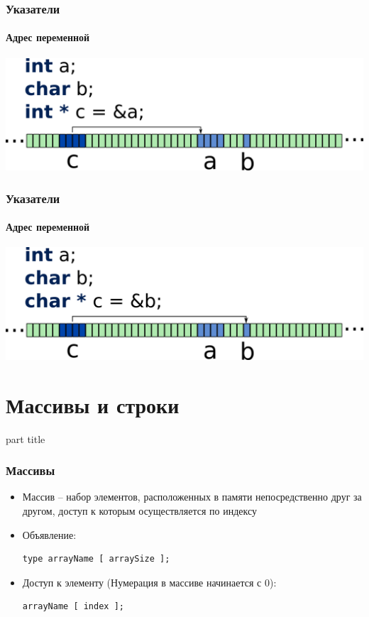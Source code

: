 \documentclass[14pt,pdf,hyperref={unicode}]{beamer}
\begin{document}
\begin{frame}[fragile]
\frametitle{Указатели} 
\framesubtitle{Адрес переменной}
\begin{center}
\includegraphics[width=0.95\linewidth]{images/memory_pointer_2.png}
\end{center}
\end{frame}

\begin{frame}[fragile]
\frametitle{Указатели} 
\framesubtitle{Адрес переменной}
\begin{center}
\includegraphics[width=0.95\linewidth]{images/memory_pointer_3.png}
\end{center}
\end{frame}


\section{Массивы и строки}
\begin{frame}
\begin{center}
\begin{beamercolorbox}[sep=8pt,center]{part
title}
\insertsection
\end{beamercolorbox}
\end{center}
\end{frame}

\begin{frame}[fragile]
\frametitle{Массивы} 
\begin{itemize}
\item Массив -- набор элементов, расположенных в памяти непосредственно друг за другом, доступ к которым осуществляется по индексу
\item Объявление:
\begin{lstlisting}
type arrayName [ arraySize ];
\end{lstlisting}
\item Доступ к элементу
(Нумерация в массиве начинается с 0):\\
\begin{lstlisting}
arrayName [ index ];
\end{lstlisting}
\end{itemize}
\end{frame}
\end{document}
